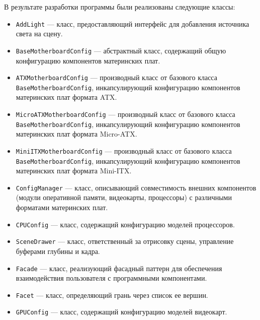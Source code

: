 В результате разработки программы были реализованы следующие классы:
\begin{itemize}[label=---]
	\item \texttt{AddLight} — класс, предоставляющий интерфейс для добавления источника света на сцену.
	
	\item \texttt{BaseMotherboardConfig} — абстрактный класс, содержащий общую конфигурацию компонентов материнских плат.
	
	\item \texttt{ATXMotherboardConfig} — производный класс от базового класса \newline \texttt{BaseMotherboardConfig}, инкапсулирующий конфигурацию компонентов материнских плат формата ATX.
	
	\item \texttt{MicroATXMotherboardConfig} — производный класс от базового класса \newline \texttt{BaseMotherboardConfig}, инкапсулирующий конфигурацию компонентов материнских плат формата Micro-ATX.
	
	\item \texttt{MiniITXMotherboardConfig} — производный класс от базового класса \newline \texttt{BaseMotherboardConfig}, инкапсулирующий конфигурацию компонентов материнских плат формата Mini-ITX.
	
	\item \texttt{ConfigManager} — класс, описывающий совместимость внешних компонентов (модули оперативной памяти, видеокарты, процессоры) с различными форматами материнских плат.
	
	\item \texttt{CPUConfig} — класс, содержащий конфигурацию моделей процессоров.
	
	\item \texttt{SceneDrawer} — класс, ответственный за отрисовку сцены, управление буферами глубины и кадра.
	
	\item \texttt{Facade} — класс, реализующий фасадный паттерн для обеспечения взаимодействия пользователя с программными компонентами.
	
	\item \texttt{Facet} — класс, определяющий грань через список ее вершин.
	
	\item \texttt{GPUConfig} — класс, содержащий конфигурацию моделей видеокарт.
	

\end{itemize}
